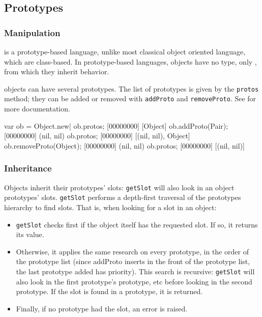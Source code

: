 \subsection{Prototypes}

\subsubsection{Manipulation}

\us is a prototype-based language, unlike most classical object
oriented language, which are class-based. In prototype-based
languages, objects have no type, only , from which they
inherit behavior.

\us objects can have several prototypes. The list of prototypes is
given by the \lstinline|protos| method; they can be added or removed
with \lstinline|addProto| and \lstinline|removeProto|.  See
 for more documentation.

\begin{urbiscript}
var ob = Object.new|
ob.protos;
[00000000] [Object]
ob.addProto(Pair);
[00000000] (nil, nil)
ob.protos;
[00000000] [(nil, nil), Object]
ob.removeProto(Object);
[00000000] (nil, nil)
ob.protos;
[00000000] [(nil, nil)]
\end{urbiscript}

\subsubsection{Inheritance}

Objects inherit their prototypes' slots: \lstinline|getSlot| will also
look in an object prototypes' slots. \lstinline|getSlot| performs a
depth-first traversal of the prototypes hierarchy to find slots. That
is, when looking for a slot in an object:

\begin{itemize}
\item \lstinline|getSlot| checks first if the object itself has the
  requested slot. If so, it returns its value.
\item Otherwise, it applies the same research on every prototype, in
  the order of the prototype list (since addProto inserts in the front
  of the prototype list, the last prototype added has priority). This
  search is recursive: \lstinline|getSlot| will also look in the first
  prototype's prototype, etc before looking in the second
  prototype. If the slot is found in a prototype, it is returned.
\item Finally, if no prototype had the slot, an error is raised.
\end{itemize}


